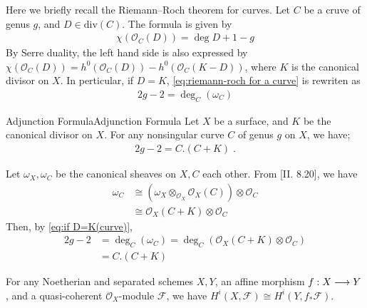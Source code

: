 \documentclass[a4paper, eqnumbering=section, thmnumbering=section, 10pt]{simple-eng}
\begin{document}
Here we briefly recall the Riemann–Roch theorem for curves.
Let $C$ be a cruve of genus $g$, and $D\in \text{div}(C)$. The formula is given by
\begin{align}\label{eq:riemann-roch for a curve}
    \chi(\mathscr{O}_C(D)) = \deg D + 1 - g
\end{align}
By Serre duality, the left hand side is also expressed by 
$\chi(\mathscr{O}_C(D)) = h^0(\mathscr{O}_C(D)) - h^0(\mathscr{O}_C(K-D)) $, where $K$ is 
the canonical divisor on $X$. In perticular, if $D=K$, \eqref{eq:riemann-roch for a curve} 
is rewriten as 
\begin{align}\label{eq:if D=K(curve)}
    2g-2 = \deg_C(\omega_C) 
\end{align}

\begin{proposition}{Adjunction Formula}{Adjunction Formula}
Let $X$ be a surface, and $K$ be the canonical divisor on $X$.
For any nonsingular curve $C$ of genus $g$ on $X$, we have;
\begin{align}
    2g-2 = C.(C+K) \;.
\end{align}
\end{proposition}
\begin{myproof}
    Let $\omega_X, \omega_C$ be the canonical sheaves on $X, C$ each other. 
    From [II. 8.20], we have 
    \begin{align}
    \omega_C 
    &\cong \left(\omega_X\otimes_{\mathscr{O}_X}\mathscr{O}_X(C)\right)\otimes\mathscr{O}_C\\
    &\cong \mathscr{O}_X(C+K)\otimes \mathscr{O}_C
    \end{align}
    Then, by \eqref{eq:if D=K(curve)}, 
    \begin{align}
        2g-2 &= \deg_C(\omega_C) = \deg_C(\mathscr{O}_X(C+K)\otimes \mathscr{O}_C)\\
            &= C.(C+K)
    \end{align}\hfill
\end{myproof}

\begin{remark}
    For any Noetherian and separated schemes $X,Y$, an affine morphism $f:X\longrightarrow Y$, and 
    a quasi-coherent $\mathscr{O}_X$-module $\mathscr{F}$, we have 
    $H^i(X,\mathscr{F}) \cong H^i(Y,f_\ast\mathscr{F})$. 
\end{remark}
\end{document}
